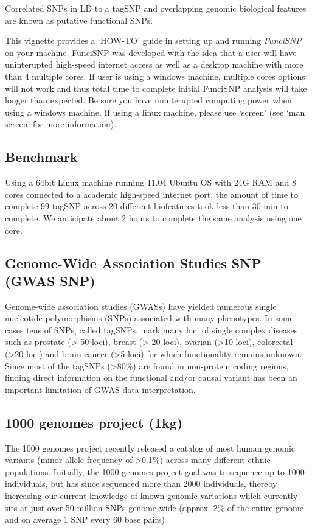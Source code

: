 \documentclass[12pt,fullpage]{article}
\newcommand{\Rpackage}[1]{{\textit{#1}}}
\begin{document}
Correlated SNPs in LD to a tagSNP and overlapping genomic biological features
are known as putative functional SNPs.

This vignette provides a `HOW-TO' guide in setting up and running
\Rpackage{FunciSNP} on your machine. FunciSNP was developed with the idea that a
user will have uninterupted high-speed internet access as well as a desktop
machine with  more than 4 multiple cores. If user is using a windows machine,
multiple cores options will not work and thus total time to complete
initial FunciSNP analysis will take longer than expected. Be sure you
have uninterupted computing power when using a windows machine. If using
a linux machine, please use `screen' (see `man screen' for more
information).

\subsection{Benchmark}
Using a 64bit Linux machine running 11.04 Ubuntu OS with 24G RAM and 8 cores
connected to a academic high-speed internet port, the amount of time to complete
99 tagSNP across 20 different biofeatures took less than 30 min to complete. We
anticipate about 2 hours to complete the same analysis using one core.

\subsection{Genome-Wide Association Studies SNP (GWAS SNP)}
Genome-wide association studies (GWASs) have yielded numerous single nucleotide
polymorphisms (SNPs) associated with many phenotypes. In some cases tens of
SNPs, called tagSNPs, mark many loci of single complex diseases such as prostate
(> 50 loci), breast (> 20 loci), ovarian (>10 loci), colorectal (>20 loci) and
brain cancer (>5 loci) for which functionality remains unknown. Since most of
the tagSNPs (>80\%) are found in non-protein coding regions, finding direct
information on the functional and/or causal variant has been an important
limitation of GWAS data interpretation.

\subsection{1000 genomes project (1kg)}
The 1000 genomes project recently released a catalog of most human genomic
variants (minor allele frequency of >0.1\%) across many different ethnic
populations. Initially, the 1000 genomes project goal was to sequence up to 1000
individuals, but has since sequenced more than 2000 individuals, thereby
increasing our current knowledge of known genomic variations which currently
sits at just over 50 million SNPs genome wide (approx. 2\% of the entire genome
        and on average 1 SNP every 60 base pairs)
\end{document}
